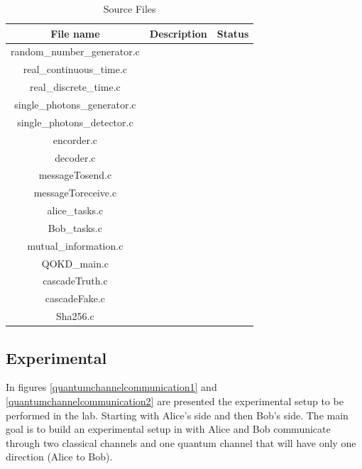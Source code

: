 \begin{table}[hbt]
\centering
\caption{Source Files}
\label{tab:sourcefiles}
\begin{tabular}{|c|c|c|}
\hline
\textbf{File name}           & \textbf{Description}  & \textbf{Status}       \\ \hline
random\_number\_generator.c  &                       &                       \\ \hline
real\_continuous\_time.c     &                       &                       \\ \hline
real\_discrete\_time.c       &                       &                       \\ \hline
single\_photons\_generator.c &                       &                       \\ \hline
single\_photons\_detector.c  &                       &                       \\ \hline
encorder.c                   &                       &                       \\ \hline
decoder.c                    &                       &                       \\ \hline
messageTosend.c              &                       &                       \\ \hline
messageToreceive.c           &                       &                       \\ \hline
alice\_tasks.c               &                       &                       \\ \hline
Bob\_tasks.c                 &                       &                       \\ \hline
mutual\_information.c        &                       &                       \\ \hline
QOKD\_main.c                 &                       &                       \\ \hline
cascadeTruth.c               &                       &                       \\ \hline
cascadeFake.c                &                       &                       \\ \hline
Sha256.c                     &                       &                       \\ \hline
\end{tabular}
\end{table}

\subsection{Experimental}
In figures \ref{quantumchannelcommunication1} and \ref{quantumchannelcommunication2} are presented the experimental setup to be performed in the lab. Starting with Alice's side and then Bob's side. The main goal is to build an experimental setup in with Alice and Bob communicate through two classical channels and one quantum channel that will have only one direction (Alice to Bob).

